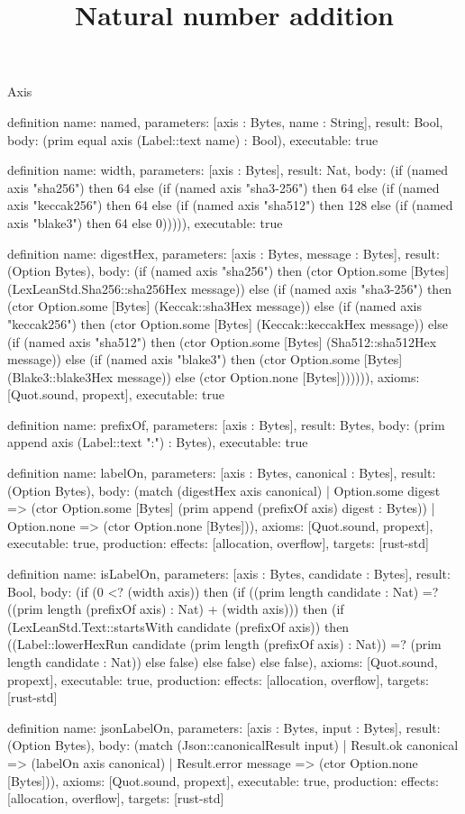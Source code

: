 \begin{lexlean}{Axis}
\title{Natural number addition}
\begin{semanticmodule}
definition{
  name: named,
  parameters: [axis : Bytes, name : String],
  result: Bool,
  body: (prim equal axis (Label::text name) : Bool),
  executable: true
}

definition{
  name: width,
  parameters: [axis : Bytes],
  result: Nat,
  body: (if (named axis "sha256") then 64 else (if (named axis "sha3-256") then 64 else (if (named axis "keccak256") then 64 else (if (named axis "sha512") then 128 else (if (named axis "blake3") then 64 else 0))))),
  executable: true
}

definition{
  name: digestHex,
  parameters: [axis : Bytes, message : Bytes],
  result: (Option Bytes),
  body: (if (named axis "sha256") then (ctor Option.some [Bytes] (LexLeanStd.Sha256::sha256Hex message)) else (if (named axis "sha3-256") then (ctor Option.some [Bytes] (Keccak::sha3Hex message)) else (if (named axis "keccak256") then (ctor Option.some [Bytes] (Keccak::keccakHex message)) else (if (named axis "sha512") then (ctor Option.some [Bytes] (Sha512::sha512Hex message)) else (if (named axis "blake3") then (ctor Option.some [Bytes] (Blake3::blake3Hex message)) else (ctor Option.none [Bytes])))))),
  axioms: [Quot.sound, propext],
  executable: true
}

definition{
  name: prefixOf,
  parameters: [axis : Bytes],
  result: Bytes,
  body: (prim append axis (Label::text ":") : Bytes),
  executable: true
}

definition{
  name: labelOn,
  parameters: [axis : Bytes, canonical : Bytes],
  result: (Option Bytes),
  body: (match (digestHex axis canonical)
    | Option.some digest => (ctor Option.some [Bytes] (prim append (prefixOf axis) digest : Bytes))
    | Option.none => (ctor Option.none [Bytes])),
  axioms: [Quot.sound, propext],
  executable: true,
  production: {effects: [allocation, overflow], targets: [rust-std]}
}

definition{
  name: isLabelOn,
  parameters: [axis : Bytes, candidate : Bytes],
  result: Bool,
  body: (if (0 <? (width axis)) then (if ((prim length candidate : Nat) =? ((prim length (prefixOf axis) : Nat) + (width axis))) then (if (LexLeanStd.Text::startsWith candidate (prefixOf axis)) then ((Label::lowerHexRun candidate (prim length (prefixOf axis) : Nat)) =? (prim length candidate : Nat)) else false) else false) else false),
  axioms: [Quot.sound, propext],
  executable: true,
  production: {effects: [allocation, overflow], targets: [rust-std]}
}

definition{
  name: jsonLabelOn,
  parameters: [axis : Bytes, input : Bytes],
  result: (Option Bytes),
  body: (match (Json::canonicalResult input)
    | Result.ok canonical => (labelOn axis canonical)
    | Result.error message => (ctor Option.none [Bytes])),
  axioms: [Quot.sound, propext],
  executable: true,
  production: {effects: [allocation, overflow], targets: [rust-std]}
}
\end{semanticmodule}
\end{lexlean}
